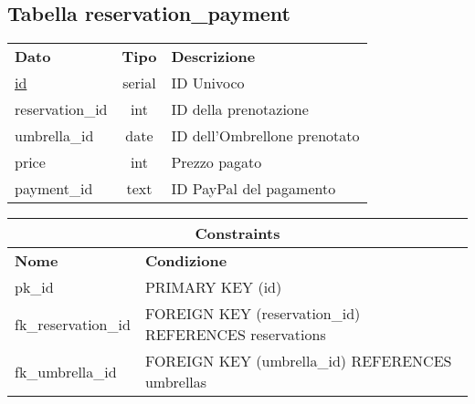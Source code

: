 \begin{center}
    \subsection*{Tabella \textnormal{reservation\_payment}}
    
    \begin{tabularx}{\textwidth}{l c X}
        \toprule
        \textbf{Dato} & \textbf{Tipo} & \textbf{Descrizione}\\
        \underline{id} & serial & ID Univoco \\
        reservation\_id & int & ID della prenotazione\\
        umbrella\_id & date & ID dell'Ombrellone prenotato\\
        price & int & Prezzo pagato\\
        payment\_id & text & ID PayPal del pagamento\\
        \midrule
    \end{tabularx}
    \begin{tabularx}{\textwidth}{l X}
        \multicolumn{2}{c}{\textbf{Constraints}}\\
        \midrule
        \textbf{Nome} & \textbf{Condizione}\\
        pk\_id & PRIMARY KEY (id)\\
        fk\_reservation\_id & FOREIGN KEY (reservation\_id) REFERENCES reservations\\
        fk\_umbrella\_id & FOREIGN KEY (umbrella\_id) REFERENCES umbrellas\\
        \bottomrule
    \end{tabularx}
    \bigskip
\end{center}
